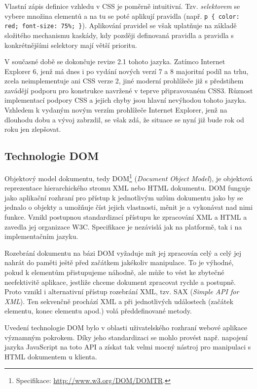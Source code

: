 Vlastní zápis definice vzhledu v CSS je poměrně intuitivní. Tzv. {\it
selektorem} se vybere množina elementů a na tu se poté aplikují
pravidla (např. {\tt p \{ color: red; font-size: 75\%; \}}).
Aplikování pravidel se však uplatňuje na základě složitého mechanismu
kaskády, kdy později definovaná pravidla a pravidla s konkrétnějšími
selektory mají větší prioritu. \cite{css2}

V současné době se dokončuje revize 2.1 tohoto jazyka. Zatímco
Internet Explorer 6, jenž má dnes i po vydání nových verzí 7 a 8
majoritní podíl na trhu, zcela neimplementuje ani CSS verze 2, jiné
moderní prohlížeče již s předstihem zavádějí podporu pro konstrukce
navržené v teprve připravovaném CSS3. Různost implementací podpory CSS
a jejich chyby jsou hlavní nevýhodou tohoto jazyka. Vzhledem k vydaným
novým verzím prohlížeče Internet Explorer, jenž na dlouhodu dobu
 a vývoj zabrzdil, se však zdá, že situace se nyní již
bude rok od roku jen zlepšovat.

\subsection{Technologie DOM}\label{dom}
Objektový model dokumentu, tedy DOM\footnote{Specifikace:
\url{http://www.w3.org/DOM/DOMTR}.} ({\it Document Object Model}), je
objektová reprezentace hierarchického stromu XML nebo HTML dokumentu. DOM funguje jako aplikační rozhraní pro přístup k jednotlivým uzlům
dokumentu jako by se jednalo o objekty a umožňuje číst jejich
vlastnosti, měnit je a vykonávat nad nimi funkce. Vznikl postupnou
standardizací přístupu ke zpracování XML a HTML a zavedla jej
organizace W3C. Specifikace je nezávislá jak na platformě, tak i na
implementačním jazyku.

Rozebrání dokumentu na bázi DOM vyžaduje mít jej zpracován celý a
celý jej nahrát do paměti ještě před začátkem jakékoliv manipulace.
To je výhodné, pokud k elementům přistupujeme náhodně, ale může to
vést ke zbytečné neefektivitě aplikace, jestliže chceme dokument
zpracovat rychle a postupně. Proto vznikl i alternativní
přístup rozebrání XML, tzv. SAX ({\it Simple API for XML}).
Ten sekvenčně prochází XML a při jednotlivých událostech (začátek
elementu, konec elementu apod.) volá předdefinované metody.

Uvedení technologie DOM bylo v oblasti uživatelského rozhraní webové
aplikace významným pokrokem. Díky jeho standardizaci se mohlo
provést např. napojení jazyka JavaScript na toto API a získat tak velmi mocný
nástroj pro manipulaci s HTML dokumentem u klienta.

